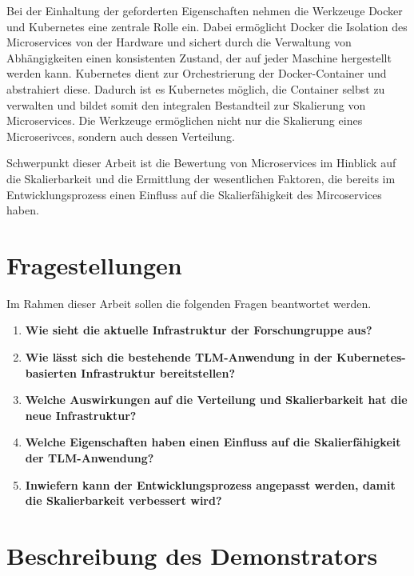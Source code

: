 Bei der Einhaltung der geforderten Eigenschaften nehmen die Werkzeuge Docker und Kubernetes eine zentrale Rolle ein.
Dabei ermöglicht Docker die Isolation des Microservices von der Hardware und sichert durch die Verwaltung von Abhängigkeiten einen konsistenten Zustand, der auf jeder Maschine hergestellt werden kann. 
Kubernetes dient zur Orchestrierung der Docker-Container und abstrahiert diese.
Dadurch ist es Kubernetes möglich, die Container selbst zu verwalten und bildet somit den integralen Bestandteil zur Skalierung von Microservices.
Die Werkzeuge ermöglichen nicht nur die Skalierung eines Microserivces, sondern auch dessen Verteilung.

Schwerpunkt dieser Arbeit ist die Bewertung von Microservices im Hinblick auf die Skalierbarkeit und die Ermittlung der wesentlichen Faktoren, die bereits im Entwicklungsprozess einen Einfluss auf die Skalierfähigkeit des Mircoservices haben.

\section{Fragestellungen}

Im Rahmen dieser Arbeit sollen die folgenden Fragen beantwortet werden.

\begin{enumerate}
	\item \textbf{Wie sieht die aktuelle Infrastruktur der Forschungruppe aus?}
    \item \textbf{Wie lässt sich die bestehende TLM-Anwendung in der Kubernetes-basierten Infrastruktur bereitstellen?}
	\item \textbf{Welche Auswirkungen auf die Verteilung und Skalierbarkeit hat die neue Infrastruktur?}
	\item \textbf{Welche Eigenschaften haben einen Einfluss auf die Skalierfähigkeit der TLM-Anwendung?}
	\item \textbf{Inwiefern kann der Entwicklungsprozess angepasst werden, damit die Skalierbarkeit verbessert wird?}
\end{enumerate}

\section{Beschreibung des Demonstrators}




